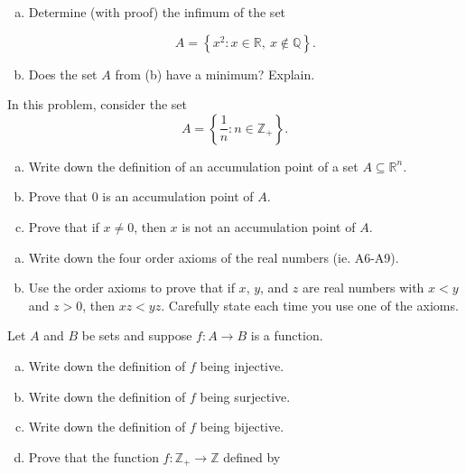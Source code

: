 \documentclass[11pt]{exam}
\theoremstyle{definition}
\begin{document}
\begin{questions}
\begin{enumerate}[(a)]
\item Determine (with proof) the infimum of the set 

$$A = \left\lbrace x^2: x\in\mathbb{R},\ x\notin\mathbb{Q}\right\rbrace.$$
\vspace{5in}

\item Does the set $A$ from (b) have a minimum?  Explain.
\end{enumerate}

\newpage
\question[10]\mbox{}

In this problem, consider the set
$$A = \left\lbrace\frac{1}{n}: n\in\mathbb{Z}_+\right\rbrace.$$

\begin{enumerate}[(a)]
\item
Write down the definition of an accumulation point of a set $A\subseteq \mathbb R^n$.
\vspace{1in}
\item
Prove that $0$ is an accumulation point of $A$.
\vspace{3in}
\item
Prove that if $x\neq 0$, then $x$ is not an accumulation point of $A$.
\end{enumerate}


\newpage
\question[10]\mbox{}

\begin{enumerate}[(a)]
\item  Write down the four order axioms of the real numbers (ie. A6-A9).
\vspace{4in}
\item  Use the order axioms to prove that if $x$, $y$, and $z$ are real numbers with $x < y$ and $z > 0$, then $xz < yz$.  Carefully state each time you use one of the axioms.
\end{enumerate}

\newpage
\question[10]\mbox{}

Let $A$ and $B$ be sets and suppose $f: A\rightarrow B$ is a function.

\begin{enumerate}[(a)]
\item  Write down the definition of $f$ being injective.
\vspace{1in}
\item  Write down the definition of $f$ being surjective.
\vspace{1in}
\item  Write down the definition of $f$ being bijective.
\vspace{1in}
\item  Prove that the function $f: \mathbb Z_+\rightarrow\mathbb Z$ defined by


\end{enumerate}
\end{questions}
\end{document}
